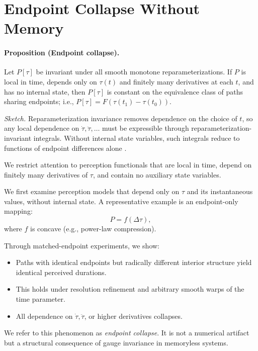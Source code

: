 \documentclass[11pt]{article}
\begin{document}
\section{Endpoint Collapse Without Memory}

\paragraph{Proposition (Endpoint collapse).}
Let $P[\tau]$ be invariant under all smooth monotone reparameterizations. If $P$ is local in time, depends only on $\tau(t)$ and finitely many derivatives at each $t$, and has no internal state, then $P[\tau]$ is constant on the equivalence class of paths sharing endpoints; i.e., $P[\tau] = F(\tau(t_1)-\tau(t_0))$.

\noindent
\emph{Sketch.}
Reparameterization invariance removes dependence on the choice of $t$, so any local dependence on $\dot{\tau}, \ddot{\tau}, \ldots$ must be expressible through reparameterization-invariant integrals. Without internal state variables, such integrals reduce to functions of endpoint differences alone \citep{fulop1998reparam,bertschinger2002gauge}.



We restrict attention to perception functionals that are local in time, depend on finitely many derivatives of $\tau$, and contain no auxiliary state variables.

We first examine perception models that depend only on $\tau$ and its instantaneous values, without internal state. A representative example is an endpoint-only mapping:
\[
P = f(\Delta \tau),
\]
where $f$ is concave (e.g., power-law compression).

Through matched-endpoint experiments, we show:

\begin{itemize}
\item Paths with identical endpoints but radically different interior structure yield identical perceived durations.
\item This holds under resolution refinement and arbitrary smooth warps of the time parameter.
\item All dependence on $\dot{\tau}, \ddot{\tau}$, or higher derivatives collapses.
\end{itemize}

We refer to this phenomenon as \emph{endpoint collapse}. It is not a numerical artifact but a structural consequence of gauge invariance in memoryless systems.
\end{document}
